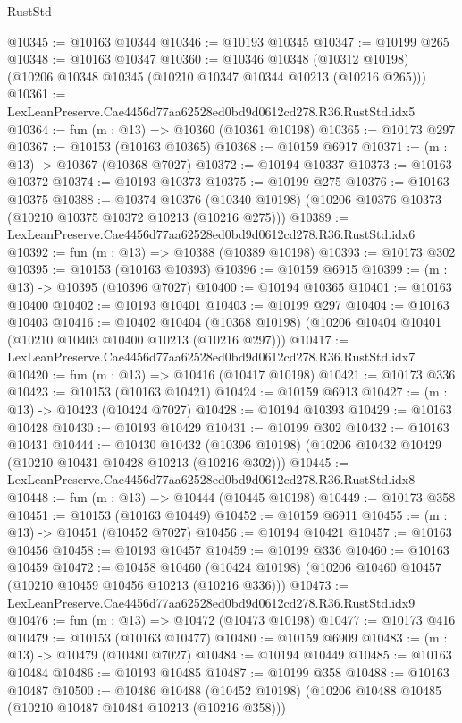 \begin{lexlean}{RustStd}
\begin{coremodule}
@10345 := @10163 @10344
@10346 := @10193 @10345
@10347 := @10199 @265
@10348 := @10163 @10347
@10360 := @10346
    @10348
    (@10312 @10198)
    (@10206 @10348 @10345 (@10210 @10347 @10344 @10213 (@10216 @265)))
@10361 := LexLeanPreserve.Cae4456d77aa62528ed0bd9d0612cd278.R36.RustStd.idx5
@10364 := fun (m : @13) => @10360 (@10361 @10198)
@10365 := @10173 @297
@10367 := @10153 (@10163 @10365)
@10368 := @10159 @6917
@10371 := (m : @13) -> @10367 (@10368 @7027)
@10372 := @10194 @10337
@10373 := @10163 @10372
@10374 := @10193 @10373
@10375 := @10199 @275
@10376 := @10163 @10375
@10388 := @10374
    @10376
    (@10340 @10198)
    (@10206 @10376 @10373 (@10210 @10375 @10372 @10213 (@10216 @275)))
@10389 := LexLeanPreserve.Cae4456d77aa62528ed0bd9d0612cd278.R36.RustStd.idx6
@10392 := fun (m : @13) => @10388 (@10389 @10198)
@10393 := @10173 @302
@10395 := @10153 (@10163 @10393)
@10396 := @10159 @6915
@10399 := (m : @13) -> @10395 (@10396 @7027)
@10400 := @10194 @10365
@10401 := @10163 @10400
@10402 := @10193 @10401
@10403 := @10199 @297
@10404 := @10163 @10403
@10416 := @10402
    @10404
    (@10368 @10198)
    (@10206 @10404 @10401 (@10210 @10403 @10400 @10213 (@10216 @297)))
@10417 := LexLeanPreserve.Cae4456d77aa62528ed0bd9d0612cd278.R36.RustStd.idx7
@10420 := fun (m : @13) => @10416 (@10417 @10198)
@10421 := @10173 @336
@10423 := @10153 (@10163 @10421)
@10424 := @10159 @6913
@10427 := (m : @13) -> @10423 (@10424 @7027)
@10428 := @10194 @10393
@10429 := @10163 @10428
@10430 := @10193 @10429
@10431 := @10199 @302
@10432 := @10163 @10431
@10444 := @10430
    @10432
    (@10396 @10198)
    (@10206 @10432 @10429 (@10210 @10431 @10428 @10213 (@10216 @302)))
@10445 := LexLeanPreserve.Cae4456d77aa62528ed0bd9d0612cd278.R36.RustStd.idx8
@10448 := fun (m : @13) => @10444 (@10445 @10198)
@10449 := @10173 @358
@10451 := @10153 (@10163 @10449)
@10452 := @10159 @6911
@10455 := (m : @13) -> @10451 (@10452 @7027)
@10456 := @10194 @10421
@10457 := @10163 @10456
@10458 := @10193 @10457
@10459 := @10199 @336
@10460 := @10163 @10459
@10472 := @10458
    @10460
    (@10424 @10198)
    (@10206 @10460 @10457 (@10210 @10459 @10456 @10213 (@10216 @336)))
@10473 := LexLeanPreserve.Cae4456d77aa62528ed0bd9d0612cd278.R36.RustStd.idx9
@10476 := fun (m : @13) => @10472 (@10473 @10198)
@10477 := @10173 @416
@10479 := @10153 (@10163 @10477)
@10480 := @10159 @6909
@10483 := (m : @13) -> @10479 (@10480 @7027)
@10484 := @10194 @10449
@10485 := @10163 @10484
@10486 := @10193 @10485
@10487 := @10199 @358
@10488 := @10163 @10487
@10500 := @10486
    @10488
    (@10452 @10198)
    (@10206 @10488 @10485 (@10210 @10487 @10484 @10213 (@10216 @358)))

\end{coremodule}
\end{lexlean}

